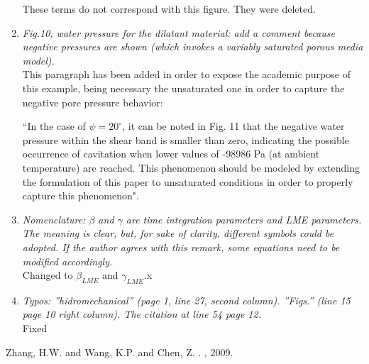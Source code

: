 \documentclass[12pt]{article}
\begin{document}
\begin{enumerate}
These terms do not correspond with this figure. They were deleted.

\item \textit{Fig.10, water pressure for the dilatant material: add a comment because negative pressures are shown (which invokes a variably saturated porous media model).}\\

This paragraph has been added in order to expose the academic purpose of this example, being necessary the unsaturated one in order to capture the negative pore pressure behavior:

``In the case of $\psi=20^\circ$, it can be noted in Fig. 11 that the negative water pressure within the shear band is smaller than zero, indicating the possible occurrence of cavitation when lower values of -98986 Pa (at ambient temperature) are reached. This phenomenon should be modeled by extending the formulation of this paper to unsaturated conditions in order to properly capture this phenomenon".

\item \textit{Nomenclature: $\beta$ and $\gamma$ are time integration parameters and LME parameters. The meaning is clear, but, for sake of clarity, different symbols could be adopted. If the author agrees with this remark, some equations need to be modified accordingly.}\\

Changed to $\beta_{LME}$ and $\gamma_{LME}$.x

\item \textit{Typos: ''hidromechanical'' (page 1, line 27, second column). ''Figs.'' (line 15 page 10 right column). The citation at line 54 page 12.}\\

Fixed

\end{enumerate}



\begin{thebibliography}{10}

Zhang, H.W. and Wang, K.P.  and Chen, Z.
.
, 2009.

\end{thebibliography}
\end{document}
